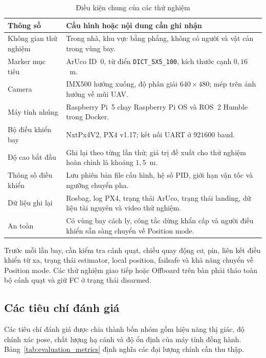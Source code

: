\begin{table}[H]
    \centering
    \small
    \caption{Điều kiện chung của các thử nghiệm}
    \label{tab:experimental_conditions}
    \begin{tabularx}{\textwidth}{>{\raggedright\arraybackslash}p{} X}
        \toprule
        \textbf{Thông số} & \textbf{Cấu hình hoặc nội dung cần ghi nhận} \\
        \midrule
        Không gian thử nghiệm & Trong nhà, khu vực bằng phẳng, không có người và vật cản trong vùng bay. \\
        Marker mục tiêu & ArUco ID~0, từ điển \texttt{DICT\_5X5\_100}, kích thước cạnh $0{,}16$~m. \\
        Camera & IMX500 hướng xuống, độ phân giải $640\times480$; mép trên ảnh hướng về mũi UAV. \\
        Máy tính nhúng & Raspberry Pi~5 chạy Raspberry Pi OS và ROS~2 Humble trong Docker. \\
        Bộ điều khiển bay & NxtPx4V2, PX4 v1.17; kết nối UART ở $921600$ baud. \\
        Độ cao bắt đầu & Ghi lại theo từng lần thử; giá trị đề xuất cho thử nghiệm hoàn chỉnh là khoảng $1{,}5$~m. \\
        Thông số điều khiển & Lưu phiên bản file cấu hình, hệ số PID, giới hạn vận tốc và ngưỡng chuyển pha. \\
        Dữ liệu ghi lại & Rosbag, log PX4, trạng thái ArUco, trạng thái landing, dữ liệu tài nguyên và video thử nghiệm. \\
        An toàn & Có vùng bay cách ly, công tắc dừng khẩn cấp và người điều khiển sẵn sàng chuyển về Position mode. \\
        \bottomrule
    \end{tabularx}
\end{table}

Trước mỗi lần bay, cần kiểm tra cánh quạt, chiều quay động cơ, pin, liên kết điều khiển từ xa, trạng thái estimator, local position, failsafe và khả năng chuyển về Position mode. Các thử nghiệm giao tiếp hoặc Offboard trên bàn phải tháo toàn bộ cánh quạt và giữ FC ở trạng thái disarmed.

\subsection{Các tiêu chí đánh giá}

Các tiêu chí đánh giá được chia thành bốn nhóm gồm hiệu năng thị giác, độ chính xác pose, chất lượng hạ cánh và độ ổn định của máy tính đồng hành. Bảng~\ref{tab:evaluation_metrics} định nghĩa các đại lượng chính cần thu thập.

